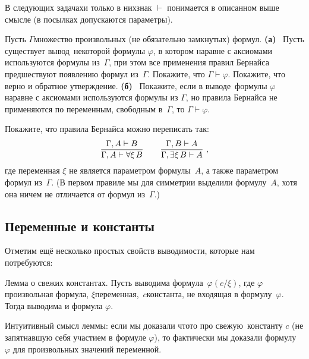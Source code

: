 В следующих задачах\т и только в них\т знак $\vdash$ понимается
в описанном выше смысле (в посылках допускаются параметры).

\begin{problem}
Пусть $\Gamma$\т множество произвольных (не обязательно замкнутых)
формул.
        \textbf{(а)}~%
Пусть существует  вывод\ некоторой
формулы $\varphi$, в котором наравне с аксиомами используются
формулы из~$\Gamma$, при этом все применения правил Бернайса
предшествуют появлению формул из~$\Gamma$. Покажите, что
$\Gamma\vdash\varphi$. Покажите, что верно и обратное
утверждение.
        \textbf{(б)}~%
Покажите, если в  выводе\ формулы $\varphi$ наравне с
аксиомами используются формулы из $\Gamma$, но правила Бернайса
не применяются по переменным, свободным в~$\Gamma$, то
${\Gamma\vdash\varphi}$.
\end{problem}

\begin{problem}
Покажите, что правила Бернайса можно переписать так:
        $$
\frac{\Gamma, A\vdash B\mathstrut}
        {\Gamma, A \vdash \forall\xi\,B\mathstrut}
\qquad
\frac{\Gamma, B\vdash A\mathstrut}
        {\Gamma, \exists\xi\,B\vdash A\mathstrut}\ ,
        $$
где переменная $\xi$ не является параметром
формулы~$A$, а также параметром формул из~$\Gamma$.
(В первом правиле мы для симметрии выделили формулу~$A$,
хотя она ничем не отличается от формул из~$\Gamma$.)
\end{problem}

\subsection*{Переменные и константы}
Отметим ещё несколько простых свойств выводимости, которые
нам потребуются:

\textsf{Лемма о свежих константах}.%
%
Пусть выводима формула~$\varphi(c/\xi)$, где $\varphi$\т
произвольная формула, $\xi$\т переменная,~$c$\т константа, не
входящая в формулу~$\varphi$. Тогда выводима и формула
$\varphi$.
        \label{lemma-fresh-constants}%

Интуитивный смысл леммы: если мы доказали что\д то про 
свежую\ константу $c$ (не запятнавшую себя участием в формуле
$\varphi$), то фактически мы доказали формулу $\varphi$ для
произвольных значений переменной.


